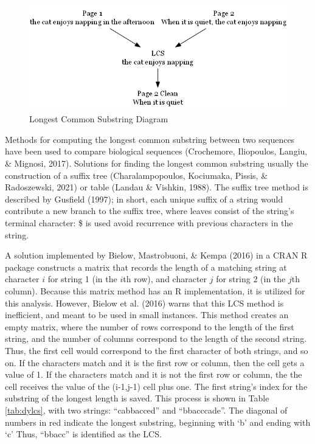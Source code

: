 \documentclass[print]{nuthesis}
\begin{document}
\begin{figure}

{\centering \includegraphics[width=\linewidth]{images/svg_graph} 

}

\caption{Longest Common Substring Diagram}\label{fig:lcs}
\end{figure}

Methods for computing the longest common substring between two sequences have been used to compare biological sequences (Crochemore, Iliopoulos, Langiu, \& Mignosi, 2017).
Solutions for finding the longest common substring usually the construction of a suffix tree (Charalampopoulos, Kociumaka, Pissis, \& Radoszewski, 2021) or table (Landau \& Vishkin, 1988).
The suffix tree method is described by Gusfield (1997); in short, each unique suffix of a string would contribute a new branch to the suffix tree, where leaves consist of the string's terminal character: \$ is used avoid recurrence with previous characters in the string.

A solution implemented by Bielow, Mastrobuoni, \& Kempa (2016) in a CRAN R package constructs a matrix that records the length of a matching string at character \(i\) for string 1 (in the \(i\)th row), and character \(j\) for string 2 (in the \(j\)th column).
Because this matrix method has an R implementation, it is utilized for this analysis.
However, Bielow et al. (2016) warns that this LCS method is inefficient, and meant to be used in small instances.
This method creates an empty matrix, where the number of rows correspond to the length of the first string, and the number of columns correspond to the length of the second string.
Thus, the first cell would correspond to the first character of both strings, and so on.
If the characters match and it is the first row or column, then the cell gets a value of 1.
If the characters match and it is not the first row or column, the the cell receives the value of the (i-1,j-1) cell plus one.
The first string's index for the substring of the longest length is saved.
This process is shown in Table \ref{tab:dylcs}, with two strings: ``cabbacced'' and ``bbacccade''.
The diagonal of numbers in red indicate the longest substring, beginning with `b' and ending with `c'
Thus, ``bbacc'' is identified as the LCS.
\end{document}
